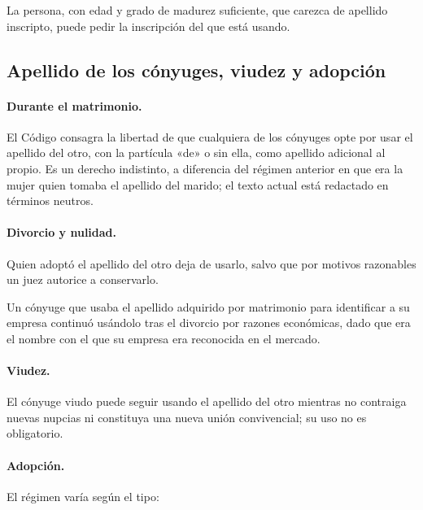 \documentclass[12pt,oneside]{book}
\begin{document}
\begin{regla}
La persona, con edad y grado de madurez suficiente, que carezca de apellido inscripto, puede pedir la inscripción del que está usando.
\end{regla}

\subsection{Apellido de los cónyuges, viudez y adopción}

\paragraph{Durante el matrimonio.} El Código consagra la libertad de que cualquiera de los cónyuges opte por usar el apellido del otro, con la partícula «de» o sin ella, como apellido adicional al propio. Es un derecho indistinto, a diferencia del régimen anterior en que era la mujer quien tomaba el apellido del marido; el texto actual está redactado en términos neutros.

\paragraph{Divorcio y nulidad.} Quien adoptó el apellido del otro deja de usarlo, salvo que por motivos razonables un juez autorice a conservarlo.

\begin{ejemplo}
Un cónyuge que usaba el apellido adquirido por matrimonio para identificar a su empresa continuó usándolo tras el divorcio por razones económicas, dado que era el nombre con el que su empresa era reconocida en el mercado.
\end{ejemplo}

\paragraph{Viudez.} El cónyuge viudo puede seguir usando el apellido del otro mientras no contraiga nuevas nupcias ni constituya una nueva unión convivencial; su uso no es obligatorio.

\paragraph{Adopción.} El régimen varía según el tipo:
\end{document}
